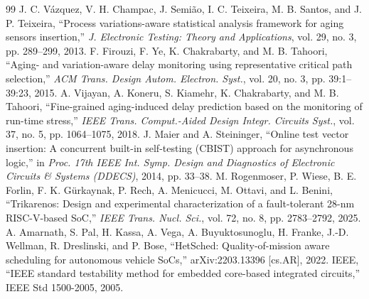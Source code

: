 \documentclass[journal]{IEEEtran}
\begin{document}
\begin{thebibliography}{99}
 J. C. V\'azquez, V. H. Champac, J. Semi\~ao, I. C. Teixeira, M. B. Santos, and J. P. Teixeira, ``Process variations-aware statistical analysis framework for aging sensors insertion,'' \emph{J. Electronic Testing: Theory and Applications}, vol. 29, no. 3, pp. 289--299, 2013.
 F. Firouzi, F. Ye, K. Chakrabarty, and M. B. Tahoori, ``Aging- and variation-aware delay monitoring using representative critical path selection,'' \emph{ACM Trans. Design Autom. Electron. Syst.}, vol. 20, no. 3, pp. 39:1--39:23, 2015.
 A. Vijayan, A. Koneru, S. Kiamehr, K. Chakrabarty, and M. B. Tahoori, ``Fine-grained aging-induced delay prediction based on the monitoring of run-time stress,'' \emph{IEEE Trans. Comput.-Aided Design Integr. Circuits Syst.}, vol. 37, no. 5, pp. 1064--1075, 2018.
 J. Maier and A. Steininger, ``Online test vector insertion: A concurrent built-in self-testing (CBIST) approach for asynchronous logic,'' in \emph{Proc. 17th IEEE Int. Symp. Design and Diagnostics of Electronic Circuits \& Systems (DDECS)}, 2014, pp. 33--38.
 M. Rogenmoser, P. Wiese, B. E. Forlin, F. K. G\"urkaynak, P. Rech, A. Menicucci, M. Ottavi, and L. Benini, ``Trikarenos: Design and experimental characterization of a fault-tolerant 28-nm RISC-V-based SoC,'' \emph{IEEE Trans. Nucl. Sci.}, vol. 72, no. 8, pp. 2783--2792, 2025.
 A. Amarnath, S. Pal, H. Kassa, A. Vega, A. Buyuktosunoglu, H. Franke, J.-D. Wellman, R. Dreslinski, and P. Bose, ``HetSched: Quality-of-mission aware scheduling for autonomous vehicle SoCs,'' arXiv:2203.13396 [cs.AR], 2022.
 IEEE, ``IEEE standard testability method for embedded core-based integrated circuits,'' IEEE Std 1500-2005, 2005.
\end{thebibliography}
\end{document}
